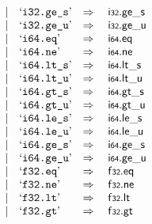 $$\begin{array}[t]{@{}lrrl@{}l@{}l@{}l@{}}
& & | & \mbox{‘\texttt{i32.ge\_s}’} & \quad\Rightarrow\quad{} & \mathsf{i{\scriptstyle 32}} {.} {\mathsf{ge}}{\mathsf{\_}}{\mathsf{s}} \\
& & | & \mbox{‘\texttt{i32.ge\_u}’} & \quad\Rightarrow\quad{} & \mathsf{i{\scriptstyle 32}} {.} {\mathsf{ge}}{\mathsf{\_}}{\mathsf{u}} \\
& & | & \mbox{‘\texttt{i64.eq}’} & \quad\Rightarrow\quad{} & \mathsf{i{\scriptstyle 64}} {.} \mathsf{eq} \\
& & | & \mbox{‘\texttt{i64.ne}’} & \quad\Rightarrow\quad{} & \mathsf{i{\scriptstyle 64}} {.} \mathsf{ne} \\
& & | & \mbox{‘\texttt{i64.lt\_s}’} & \quad\Rightarrow\quad{} & \mathsf{i{\scriptstyle 64}} {.} {\mathsf{lt}}{\mathsf{\_}}{\mathsf{s}} \\
& & | & \mbox{‘\texttt{i64.lt\_u}’} & \quad\Rightarrow\quad{} & \mathsf{i{\scriptstyle 64}} {.} {\mathsf{lt}}{\mathsf{\_}}{\mathsf{u}} \\
& & | & \mbox{‘\texttt{i64.gt\_s}’} & \quad\Rightarrow\quad{} & \mathsf{i{\scriptstyle 64}} {.} {\mathsf{gt}}{\mathsf{\_}}{\mathsf{s}} \\
& & | & \mbox{‘\texttt{i64.gt\_u}’} & \quad\Rightarrow\quad{} & \mathsf{i{\scriptstyle 64}} {.} {\mathsf{gt}}{\mathsf{\_}}{\mathsf{u}} \\
& & | & \mbox{‘\texttt{i64.le\_s}’} & \quad\Rightarrow\quad{} & \mathsf{i{\scriptstyle 64}} {.} {\mathsf{le}}{\mathsf{\_}}{\mathsf{s}} \\
& & | & \mbox{‘\texttt{i64.le\_u}’} & \quad\Rightarrow\quad{} & \mathsf{i{\scriptstyle 64}} {.} {\mathsf{le}}{\mathsf{\_}}{\mathsf{u}} \\
& & | & \mbox{‘\texttt{i64.ge\_s}’} & \quad\Rightarrow\quad{} & \mathsf{i{\scriptstyle 64}} {.} {\mathsf{ge}}{\mathsf{\_}}{\mathsf{s}} \\
& & | & \mbox{‘\texttt{i64.ge\_u}’} & \quad\Rightarrow\quad{} & \mathsf{i{\scriptstyle 64}} {.} {\mathsf{ge}}{\mathsf{\_}}{\mathsf{u}} \\
& & | & \mbox{‘\texttt{f32.eq}’} & \quad\Rightarrow\quad{} & \mathsf{f{\scriptstyle 32}} {.} \mathsf{eq} \\
& & | & \mbox{‘\texttt{f32.ne}’} & \quad\Rightarrow\quad{} & \mathsf{f{\scriptstyle 32}} {.} \mathsf{ne} \\
& & | & \mbox{‘\texttt{f32.lt}’} & \quad\Rightarrow\quad{} & \mathsf{f{\scriptstyle 32}} {.} \mathsf{lt} \\
& & | & \mbox{‘\texttt{f32.gt}’} & \quad\Rightarrow\quad{} & \mathsf{f{\scriptstyle 32}} {.} \mathsf{gt} \\

\end{array}$$
